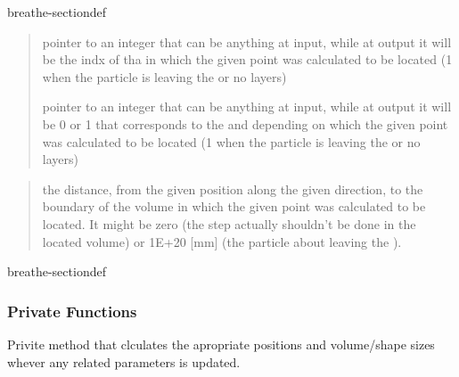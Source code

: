 \documentclass[letterpaper,10pt,english]{sphinxmanual}
\begin{document}
\begin{fulllineitems}
\begin{sphinxuseclass}{breathe-sectiondef}
\begin{fulllineitems}
\begin{quote}
\begin{description}
\sphinxAtStartPar
\sphinxstylestrong{{[}inout{]}} pointer to an integer that can be anything at input, while at output it will be the indx of tha  in which the given point was calculated to be located (\sphinxhyphen{}1 when the particle is leaving the  or no layers) 

\sphinxAtStartPar
\sphinxstylestrong{{[}inout{]}} pointer to an integer that can be anything at input, while at output it will be 0 or 1 that corresponds to the  and  depending on which the given point was calculated to be located (\sphinxhyphen{}1 when the particle is leaving the  or no layers) 

\end{description}\end{quote}
\begin{quote}\begin{description}
\sphinxAtStartPar
the distance, from the given position along the given direction, to the boundary of the volume in which the given point was calculated to be located. It might be zero (the step actually shouldn’t be done in the located volume) or 1E+20 {[}mm{]} (the particle about leaving the ). 

\end{description}\end{quote}


\end{fulllineitems}


\end{sphinxuseclass}
\begin{sphinxuseclass}{breathe-sectiondef}\subsubsection*{Private Functions}

\begin{fulllineitems}
\label{\detokenize{Simulation/SimulationCodeDoc:_CPPv4N8Geometry16UpdateParametersEv}}
\pysigstartsignatures
\pysigstartmultiline
{}
\pysigstopmultiline
\pysigstopsignatures
\sphinxAtStartPar
Privite method that clculates the apropriate positions and volume/shape sizes whever any related parameters is updated. 


\end{fulllineitems}
\end{sphinxuseclass}
\end{fulllineitems}
\end{document}
